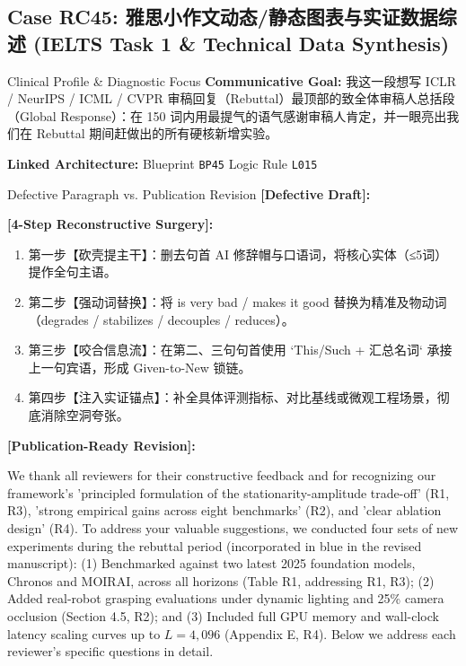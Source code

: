 \subsection{Case RC45: 雅思小作文动态/静态图表与实证数据综述 (IELTS Task 1 \& Technical Data Synthesis)}\label{case:RC45}
\begin{ConceptBox}{Clinical Profile \& Diagnostic Focus}
\textbf{Communicative Goal:} 我这一段想写 ICLR / NeurIPS / ICML / CVPR 审稿回复（Rebuttal）最顶部的致全体审稿人总括段（Global Response）：在 150 词内用最提气的语气感谢审稿人肯定，并一眼亮出我们在 Rebuttal 期间赶做出的所有硬核新增实验。\par
\textbf{Linked Architecture:} Blueprint \texttt{BP45} \enspace\textbar\enspace Logic Rule \texttt{L015}
\end{ConceptBox}
\begin{ExampleBox}{Defective Paragraph vs. Publication Revision}
\textbf{\color{TargetHighlight}[Defective Draft]:}\par
{}\par\vspace{6pt}
\textbf{\color{AcadForest}[4-Step Reconstructive Surgery]:}
\begin{enumerate}[label=\textbf{\color{AcadNavy}Step \arabic*:}, leftmargin=2em]
  \item 第一步【砍壳提主干】：删去句首 AI 修辞帽与口语词，将核心实体（≤5词）提作全句主语。
  \item 第二步【强动词替换】：将 is very bad / makes it good 替换为精准及物动词（degrades / stabilizes / decouples / reduces）。
  \item 第三步【咬合信息流】：在第二、三句句首使用 `This/Such + 汇总名词` 承接上一句宾语，形成 Given-to-New 锁链。
  \item 第四步【注入实证锚点】：补全具体评测指标、对比基线或微观工程场景，彻底消除空洞夸张。
\end{enumerate}\vspace{4pt}
\textbf{\color{AcadNavy}[Publication-Ready Revision]:}\par
We thank all reviewers for their constructive feedback and for recognizing our framework's 'principled formulation of the stationarity-amplitude trade-off' (R1, R3), 'strong empirical gains across eight benchmarks' (R2), and 'clear ablation design' (R4). To address your valuable suggestions, we conducted four sets of new experiments during the rebuttal period (incorporated in blue in the revised manuscript): (1) Benchmarked against two latest 2025 foundation models, Chronos and MOIRAI, across all horizons (Table R1, addressing R1, R3); (2) Added real-robot grasping evaluations under dynamic lighting and 25\% camera occlusion (Section 4.5, R2); and (3) Included full GPU memory and wall-clock latency scaling curves up to $L=4,096$ (Appendix E, R4). Below we address each reviewer's specific questions in detail.
\end{ExampleBox}
